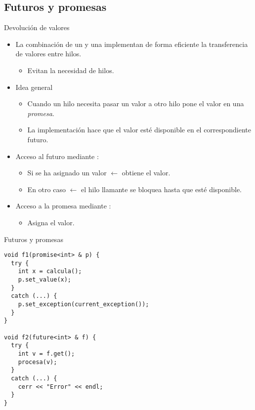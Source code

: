 \subsection{Futuros y promesas}

\begin{frame}{Devolución de valores}
\begin{itemize}
  \item La combinación de un  y una  implementan de forma
        eficiente la transferencia de valores entre hilos.
    \begin{itemize}
      \item Evitan la necesidad de hilos.
    \end{itemize}
  \item Idea general
    \begin{itemize}
      \item Cuando un hilo necesita pasar un valor a otro hilo pone el valor en una \emph{promesa}.
      \item La implementación hace que el valor esté disponible en el correspondiente futuro.
    \end{itemize}
  \item Acceso al futuro mediante :
    \begin{itemize}
      \item Si se ha asignado un valor $\leftarrow$ obtiene el valor.
      \item En otro caso $\leftarrow$ el hilo llamante se bloquea hasta que esté disponible.
    \end{itemize}
  \item Acceso a la promesa mediante :
    \begin{itemize}
      \item Asigna el valor.
    \end{itemize}
\end{itemize}
\end{frame}

\begin{frame}[fragile]{Futuros y promesas}
\begin{lstlisting}
void f1(promise<int> & p) {
  try {
    int x = calcula();
    p.set_value(x);
  }
  catch (...) {
    p.set_exception(current_exception());
  }
}

void f2(future<int> & f) {
  try {
    int v = f.get();
    procesa(v);
  }
  catch (...) {
    cerr << "Error" << endl;
  }
}
\end{lstlisting}
\end{frame}

